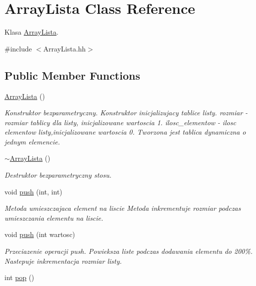 \hypertarget{a00001}{\section{Array\-Lista Class Reference}
\label{a00001}
}


Klasa \hyperlink{a00001}{Array\-Lista}.  




{\ttfamily \#include $<$Array\-Lista.\-hh$>$}

\subsection*{Public Member Functions}
\begin{DoxyCompactItemize}
\item 
\hyperlink{a00001_a645d18dcf43d2f3397d0ba90f5d8d0b4}{Array\-Lista} ()
\begin{DoxyCompactList}\small\item\em Konstruktor bezparametryczny. Konstruktor inicjalizujacy tablice listy. rozmiar -\/ rozmiar tablicy dla listy, inicjalizowane wartoscia 1. ilosc\-\_\-elementow -\/ ilosc elementow listy,inicjalizowane wartoscia 0. Tworzona jest tablica dynamiczna o jednym elemencie. \end{DoxyCompactList}\item 
\hyperlink{a00001_ab502f9c0ea71ec66954ebe675100b9ce}{$\sim$\-Array\-Lista} ()
\begin{DoxyCompactList}\small\item\em Destruktor bezparametryczny stosu. \end{DoxyCompactList}\item 
void \hyperlink{a00001_a473a71ed888097c7b14bb70cbf7eecd6}{push} (int, int)
\begin{DoxyCompactList}\small\item\em Metoda umieszczajaca element na liscie Metoda inkrementuje rozmiar podczas umieszczania elementu na liscie. \end{DoxyCompactList}\item 
void \hyperlink{a00001_a1d194e2d2e54114ef939d7fe64508840}{push} (int wartosc)
\begin{DoxyCompactList}\small\item\em Przeciazenie operacji push. Powieksza liste podczas dodawania elementu do 200\%. Nastepuje inkrementacja rozmiar listy. \end{DoxyCompactList}\item 
int \hyperlink{a00001_ae76ea59ccac91abd264cf108489d3105}{pop} ()

\end{DoxyCompactItemize}
